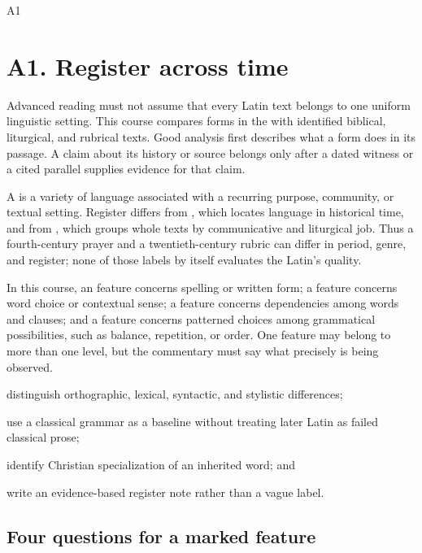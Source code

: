 \begin{courseunit}{A1}
\chapter{A1. Register across time}

Advanced reading must not assume that every Latin text belongs to one uniform
linguistic setting. This course compares forms in the \Missal{} with identified
biblical, liturgical, and rubrical texts. Good analysis first describes what a
form does in its passage. A claim about its history or source belongs only
after a dated witness or a cited parallel supplies evidence for that claim.

A  is a variety of language associated with a recurring
purpose, community, or textual setting. Register differs from ,
which locates language in historical time, and from , which groups
whole texts by communicative and liturgical job. Thus a fourth-century prayer
and a twentieth-century rubric can differ in period, genre, and register; none
of those labels by itself evaluates the Latin's quality.

In this course, an  feature concerns spelling or written
form; a  feature concerns word choice or contextual sense; a
 feature concerns dependencies among words and clauses; and a
 feature concerns patterned choices among grammatical
possibilities, such as balance, repetition, or order. One feature may belong to
more than one level, but the commentary must say what precisely is being
observed.

\begin{learningobjectives}
  \item distinguish orthographic, lexical, syntactic, and stylistic differences;
  \item use a classical grammar as a baseline without treating later Latin as
        failed classical prose;
  \item identify Christian specialization of an inherited word; and
  \item write an evidence-based register note rather than a vague label.
\end{learningobjectives}

\section{Four questions for a marked feature}


\end{courseunit}
